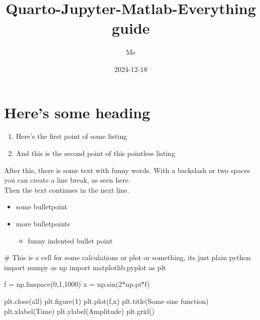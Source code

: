 \documentclass[
  letterpaper,
  DIV=11,
  numbers=noendperiod]{scrartcl}
\title{Quarto-Jupyter-Matlab-Everything guide}
\author{Me}
\date{2024-12-18}
\newenvironment{Shaded}{\begin{snugshade}}{\end{snugshade}}
\newcommand{\CommentTok}[1]{\textcolor[rgb]{0.37,0.37,0.37}{#1}}
\newcommand{\DecValTok}[1]{\textcolor[rgb]{0.68,0.00,0.00}{#1}}
\newcommand{\ImportTok}[1]{\textcolor[rgb]{0.00,0.46,0.62}{#1}}
\newcommand{\NormalTok}[1]{\textcolor[rgb]{0.00,0.23,0.31}{#1}}
\newcommand{\OperatorTok}[1]{\textcolor[rgb]{0.37,0.37,0.37}{#1}}
\newcommand{\StringTok}[1]{\textcolor[rgb]{0.13,0.47,0.30}{#1}}
\providecommand{\tightlist}{%
  \setlength{\itemsep}{0pt}\setlength{\parskip}{0pt}}\usepackage{longtable,booktabs,array}
\begin{document}
\maketitle


\section{Here's some heading}\label{heres-some-heading}

\begin{enumerate}
\def\labelenumi{\arabic{enumi}.}
\tightlist
\item
  Here's the first point of some listing
\item
  And this is the second point of this pointless listing
\end{enumerate}

After this, there is some text with funny words. With a backslash or two
spaces you can create a line break, as seen here.\\
Then the text continues in the next line.

\begin{itemize}
\tightlist
\item
  some bulletpoint
\item
  more bulletpoints

  \begin{itemize}
  \tightlist
  \item
    funny indented bullet point
  \end{itemize}
\end{itemize}

\begin{Shaded}
\begin{Highlighting}[]
\CommentTok{\# This is a cell for some calculations or plot or something, it\textquotesingle{}s just plain python}
\ImportTok{import}\NormalTok{ numpy }\ImportTok{as}\NormalTok{ np }
\ImportTok{import}\NormalTok{ matplotlib.pyplot }\ImportTok{as}\NormalTok{ plt }

\NormalTok{f }\OperatorTok{=}\NormalTok{ np.linspace(}\DecValTok{0}\NormalTok{,}\DecValTok{1}\NormalTok{,}\DecValTok{1000}\NormalTok{)}
\NormalTok{x }\OperatorTok{=}\NormalTok{ np.sin(}\DecValTok{2}\OperatorTok{*}\NormalTok{np.pi}\OperatorTok{*}\NormalTok{f)}

\NormalTok{plt.close(}\StringTok{\textquotesingle{}all\textquotesingle{}}\NormalTok{)}
\NormalTok{plt.figure(}\DecValTok{1}\NormalTok{)}
\NormalTok{plt.plot(f,x)}
\NormalTok{plt.title(}\StringTok{\textquotesingle{}Some sine function\textquotesingle{}}\NormalTok{)}
\NormalTok{plt.xlabel(}\StringTok{\textquotesingle{}Time\textquotesingle{}}\NormalTok{)}
\NormalTok{plt.ylabel(}\StringTok{\textquotesingle{}Amplitude\textquotesingle{}}\NormalTok{)}
\NormalTok{plt.grid()}
\end{Highlighting}
\end{Shaded}
\end{document}
